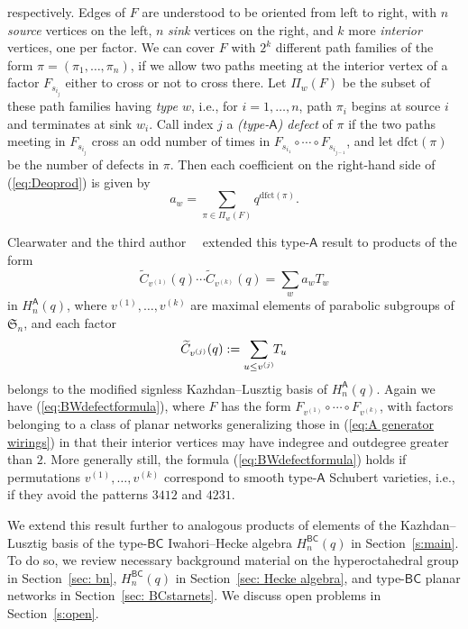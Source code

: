 \documentclass[12pt]{amsart}
\theoremstyle{definition}
\numberwithin{equation}{section}
\newcommand{\sn}{\mathfrak{S}_n}
\newcommand{\hanq}{H_n^{\msfA}(q)}
\newcommand{\hbnq}{H_n^{\msfBC}(q)}
\newcommand{\wtc}[2]{\widetilde{C}_{#1}(#2)}
\newcommand{\defeq}{:=}
\newcommand{\dfct}{\mathrm{dfct}}
\newcommand{\avoidp}{avoid the patterns $3412$ and $4231${}}
\newcommand{\ntksp}{\negthickspace}
\newcommand{\msfA}{\mathsf{A}}
\newcommand{\msfBC}{\mathsf{BC}}
\begin{document}
respectively.  Edges of $F$ are understood to be oriented from left to right, with $n$ {\em source}
vertices on the left,
$n$ {\em sink} vertices on the right,
and $k$ more {\em interior} vertices, one per factor. We can cover $F$ with $2^k$ different path families of the form $\pi = (\pi_1,\dotsc,\pi_n)$, if we allow two paths meeting at the interior vertex of a factor $F_{s_{i_j}}$ either to cross or not to cross there. Let $\Pi_w(F)$ be the subset of these path families 
having {\em type $w$}, i.e., for $i = 1,\dotsc, n$, path $\pi_i$ begins at source $i$ and terminates at sink $w_i$. Call index $j$ a {\em (type-$\msfA$) defect} of $\pi$ if the two paths meeting in $F_{s_{i_j}}$ cross an odd number of times in $F_{s_{i_1}} \circ \cdots \circ F_{s_{i_{j-1}}}$, and let $\dfct(\pi)$ be the number
of defects in $\pi$. Then each coefficient on the right-hand side of (\ref{eq:Deoprod}) is given by
\begin{equation}\label{eq:BWdefectformula}
    a_w = \sum_{\pi\in \Pi_w(F)} 
q^{\dfct(\pi)}.
\end{equation}

Clearwater and the third author~~\cite[Cor.\,5.3]{CSkanTNNChar} extended this type-$\msfA$ result to products of the form
\begin{equation}\label{eq:CSprod}
\wtc{v^{(1)}}q \cdots \wtc{v^{(k)}}q
= \sum_w a_w T_w 
\end{equation}
in $\hanq$,
where $v^{(1)}, \dotsc, v^{(k)}$
are maximal elements of parabolic subgroups of $\sn$, and 
each factor
\begin{equation*}
    \wtc{v^{(j)}}q \defeq \sum_{u \leq v^{(j)}} \ntksp T_u
\end{equation*}
belongs to the modified signless Kazhdan--Lusztig basis of $\hanq$.
Again we have (\ref{eq:BWdefectformula}), where 
$F$ has the form $F_{v^{(1)}} \circ \cdots \circ F_{v^{(k)}}$, 
with factors belonging to a class of planar networks generalizing those in
(\ref{eq:A generator wirings}) in that their interior vertices may have indegree and outdegree greater than $2$. More generally still, the formula (\ref{eq:BWdefectformula}) holds if permutations $v^{(1)}, \dotsc, v^{(k)}$ correspond to smooth type-$\msfA$ Schubert varieties, i.e., if they \avoidp.

We extend this result further to analogous products of elements
of the Kazhdan--Lusztig basis of the type-$\msfBC$ Iwahori--Hecke algebra 
$\hbnq$
in Section~\ref{s:main}.
To do so, we review necessary background material on the hyperoctahedral group in Section~\ref{sec: bn}, 
$\hbnq$ in Section~\ref{sec: Hecke algebra},
and type-$\msfBC$ planar networks in Section~\ref{sec: BCstarnets}. We discuss 
open problems in Section~\ref{s:open}.
\end{document}
